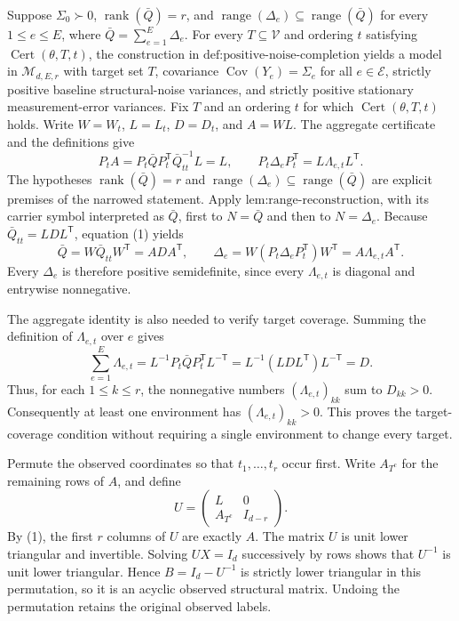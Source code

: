 Suppose \(\Sigma_0\succ0\), \(\operatorname{rank}(\bar Q)=r\), and \(\operatorname{range}(\Delta_e)\subseteq\operatorname{range}(\bar Q)\) for every \(1\le e\le E\), where \(\bar Q=\sum_{e=1}^E\Delta_e\).  For every \(T\subseteq\mathcal V\) and ordering \(t\) satisfying \(\operatorname{Cert}(\theta,T,t)\), the construction in \(\text{def:positive-noise-completion}\) yields a model in \(\mathcal M_{d,E,r}\) with target set \(T\), covariance \(\operatorname{Cov}(Y_e)=\Sigma_e\) for all \(e\in\mathcal E\), strictly positive baseline structural-noise variances, and strictly positive stationary measurement-error variances.
Fix \(T\) and an ordering \(t\) for which \(\operatorname{Cert}(\theta,T,t)\) holds.  Write \(W=W_t\), \(L=L_t\), \(D=D_t\), and \(A=WL\).  The aggregate certificate and the definitions give
\[
 P_tA=P_t\bar QP_t^{\mathsf T}\bar Q_{tt}^{-1}L=L,
 \qquad
 P_t\Delta_eP_t^{\mathsf T}=L\Lambda_{e,t}L^{\mathsf T}. \tag{1}
\]
The hypotheses \(\operatorname{rank}(\bar Q)=r\) and \(\operatorname{range}(\Delta_e)\subseteq\operatorname{range}(\bar Q)\) are explicit premises of the narrowed statement.  Apply \(\text{lem:range-reconstruction}\), with its carrier symbol interpreted as \(\bar Q\), first to \(N=\bar Q\) and then to \(N=\Delta_e\).  Because \(\bar Q_{tt}=LDL^{\mathsf T}\), equation (1) yields
\[
 \bar Q=W\bar Q_{tt}W^{\mathsf T}=ADA^{\mathsf T},
 \qquad
 \Delta_e=W(P_t\Delta_eP_t^{\mathsf T})W^{\mathsf T}
 =A\Lambda_{e,t}A^{\mathsf T}. \tag{2}
\]
Every \(\Delta_e\) is therefore positive semidefinite, since every \(\Lambda_{e,t}\) is diagonal and entrywise nonnegative.

The aggregate identity is also needed to verify target coverage.  Summing the definition of \(\Lambda_{e,t}\) over \(e\) gives
\[
 \sum_{e=1}^E\Lambda_{e,t}
 =L^{-1}P_t\bar QP_t^{\mathsf T}L^{-\mathsf T}
 =L^{-1}(LDL^{\mathsf T})L^{-\mathsf T}=D. \tag{3}
\]
Thus, for each \(1\le k\le r\), the nonnegative numbers \((\Lambda_{e,t})_{kk}\) sum to \(D_{kk}>0\).  Consequently at least one environment has \((\Lambda_{e,t})_{kk}>0\).  This proves the target-coverage condition without requiring a single environment to change every target.

Permute the observed coordinates so that \(t_1,\ldots,t_r\) occur first.  Write \(A_{T^c}\) for the remaining rows of \(A\), and define
\[
 U=\begin{pmatrix}L&0\\ A_{T^c}&I_{d-r}\end{pmatrix}. \tag{4}
\]
By (1), the first \(r\) columns of \(U\) are exactly \(A\).  The matrix \(U\) is unit lower triangular and invertible.  Solving \(UX=I_d\) successively by rows shows that \(U^{-1}\) is unit lower triangular.  Hence \(B=I_d-U^{-1}\) is strictly lower triangular in this permutation, so it is an acyclic observed structural matrix.  Undoing the permutation retains the original observed labels.

